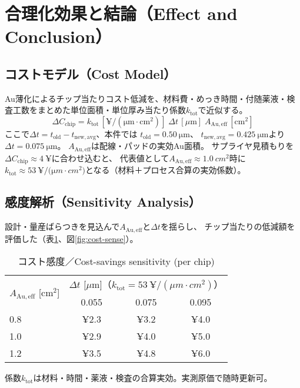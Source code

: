 \documentclass[conference]{IEEEtran}
\begin{document}
\section{合理化効果と結論（Effect and Conclusion）}
\subsection{コストモデル（Cost Model）}
Au薄化によるチップ当たりコスト低減を、材料費・めっき時間・付随薬液・検査工数をまとめた単位面積・単位厚み当たり係数$k_{\mathrm{tot}}$で近似する。
\begin{equation}
  \Delta C_{\mathrm{chip}}
  = k_{\mathrm{tot}}\,[\mathrm{¥/(\mu m\cdot cm^2)}]\;
    \Delta t\,[\mu\mathrm{m}]\;
    A_{\mathrm{Au,eff}}\,[\mathrm{cm}^2]
  \label{eq:cost}
\end{equation}
ここで$\Delta t=t_{\mathrm{old}}-t_{\mathrm{new,avg}}$、本件では
$t_{\mathrm{old}}=\SI{0.50}{\micro\meter}$、
$t_{\mathrm{new,avg}}=\SI{0.425}{\micro\meter}$より
$\Delta t=\SI{0.075}{\micro\meter}$。
$A_{\mathrm{Au,eff}}$は配線・パッドの実効Au面積。
サプライヤ見積もりを$\Delta C_{\mathrm{chip}}\approx\SI{4}{¥}$に合わせ込むと、
代表値として$A_{\mathrm{Au,eff}}\approx\SI{1.0}{cm^2}$時に
$k_{\mathrm{tot}}\approx\SI{53}{¥/(\micro m\cdot cm^2)}$となる（材料＋プロセス合算の実効係数）。

\subsection{感度解析（Sensitivity Analysis）}
設計・量産ばらつきを見込んで$A_{\mathrm{Au,eff}}$と$\Delta t$を揺らし、
チップ当たりの低減額を評価した（表\ref{tab:cost-sense}、図\ref{fig:cost-sense}）。
\begin{table}[htbp]
  \centering
  \caption{コスト感度／Cost-savings sensitivity (per chip)}
  \label{tab:cost-sense}
  \begin{tabular}{@{}lccc@{}}
    \toprule
    \multirow{2}{*}{$A_{\mathrm{Au,eff}}$ [cm$^2$]} &
    \multicolumn{3}{c}{$\Delta t$ [$\mu$m]（$k_{\mathrm{tot}}=\SI{53}{¥/(\mu m\cdot cm^2)}$）}\\
    \cmidrule(l){2-4}
     & 0.055 & 0.075 & 0.095 \\
    \midrule
    0.8 & ¥2.3 & ¥3.2 & ¥4.0 \\
    1.0 & ¥2.9 & ¥4.0 & ¥5.0 \\
    1.2 & ¥3.5 & ¥4.8 & ¥6.0 \\
    \bottomrule
  \end{tabular}
  \vspace{2pt}
  \footnotesize 係数$k_{\mathrm{tot}}$は材料・時間・薬液・検査の合算実効。実測原価で随時更新可。
\end{table}
\end{document}
